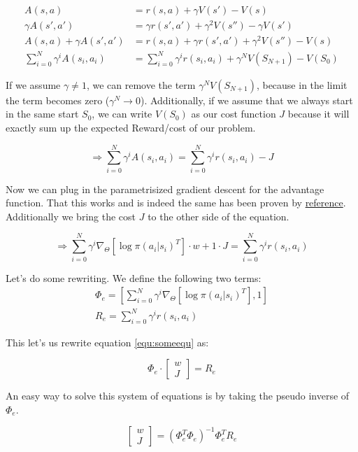 \documentclass{article}
\begin{document}
\begin{align}
	A(s,a) &= r(s,a) + \gamma V(s') - V(s) \\
	\gamma A(s',a') &= \gamma r(s', a') + \gamma^2V(s'') - \gamma V(s') \\
	A(s, a) + \gamma A(s', a') &= r(s,a) + \gamma r(s',a') + \gamma^2 V(s'') - V(s) \\
	\sum_{i = 0}^{N}\gamma^i A(s_i, a_i) &= \sum_{i = 0}^{N}\gamma^i r(s_i, a_i) + \gamma^N V(S_{N+1}) - V(S_0)
\end{align}

\noindent If we assume $\gamma \neq 1$, we can remove the term $\gamma^N V(S_{N+1})$, because in the limit the term becomes zero ($\gamma^N \rightarrow 0$). Additionally, if we assume that we always start in the same start $S_0$, we can write $V(S_0)$ as our cost function $J$ because it will exactly sum up the expected Reward/cost of our problem.

\begin{equation}
	\Rightarrow \sum_{i = 0}^{N}\gamma^i A(s_i, a_i) = \sum_{i = 0}^{N}\gamma^i r(s_i, a_i) - J
\end{equation}

\noindent Now we can plug in the parametrisized gradient descent for the advantage function. That this works and is indeed the same has been proven by \underline{reference}. Additionally we bring the cost $J$ to the other side of the equation.

\begin{equation}
	\label{equ:someequ}
	\Rightarrow \sum_{i = 0}^{N} \gamma^i \nabla_{\Theta} \left[\log \pi(a_i | s_i)^T\right] \cdot w + 1 \cdot J = \sum_{i = 0}^{N}\gamma^i r(s_i, a_i)
\end{equation}

\noindent Let's do some rewriting. We define the following two terms:
\begin{align}
	\Phi_e = \left[  \sum_{i = 0}^{N} \gamma^i \nabla_{\Theta} \left[\log \pi(a_i | s_i)^T\right] , 1 \right]\\
	R_e = \sum_{i = 0}^{N}\gamma^i r(s_i, a_i)
\end{align}

\noindent This let's us rewrite equation \ref{equ:someequ} as:

\begin{equation}
	\Phi_e \cdot \begin{bmatrix} w\\J \end{bmatrix}  = R_e
\end{equation}

\noindent An easy way to solve this system of equations is by taking the pseudo inverse of $\Phi_e$.

\begin{equation}
	\begin{bmatrix} w\\J \end{bmatrix} = (\Phi_e^T \Phi_e)^{-1} \Phi_e^T R_e
\end{equation}


\end{document}
